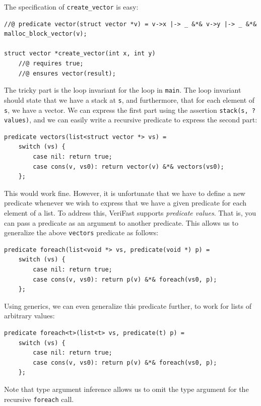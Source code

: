 \documentclass{article}
\begin{document}
The specification of \lstinline!create_vector! is easy:

\begin{lstlisting}
//@ predicate vector(struct vector *v) = v->x |-> _ &*& v->y |-> _ &*& malloc_block_vector(v);

struct vector *create_vector(int x, int y)
    //@ requires true;
    //@ ensures vector(result);
\end{lstlisting}

The tricky part is the loop invariant for the loop in
\lstinline!main!. The loop invariant should state that we have
a stack at \lstinline!s!, and furthermore, that for each
element of \lstinline!s!, we have a vector. We can express the
first part using the assertion \lstinline!stack(s, ?values)!,
and we can easily write a recursive predicate to express the
second part:

\begin{lstlisting}
predicate vectors(list<struct vector *> vs) =
    switch (vs) {
        case nil: return true;
        case cons(v, vs0): return vector(v) &*& vectors(vs0);
    };
\end{lstlisting}

This would work fine. However, it is unfortunate that we have
to define a new predicate whenever we wish to express that we
have a given predicate for each element of a list. To address
this, VeriFast supports \emph{predicate values}. That is, you
can pass a predicate as an argument to another predicate. This
allows us to generalize the above \lstinline!vectors! predicate
as follows:

\begin{lstlisting}
predicate foreach(list<void *> vs, predicate(void *) p) =
    switch (vs) {
        case nil: return true;
        case cons(v, vs0): return p(v) &*& foreach(vs0, p);
    };
\end{lstlisting}

Using generics, we can even generalize this predicate further,
to work for lists of arbitrary values:

\begin{lstlisting}
predicate foreach<t>(list<t> vs, predicate(t) p) =
    switch (vs) {
        case nil: return true;
        case cons(v, vs0): return p(v) &*& foreach(vs0, p);
    };
\end{lstlisting}

Note that type argument inference allows us to omit the type
argument for the recursive \lstinline!foreach! call.
\end{document}
